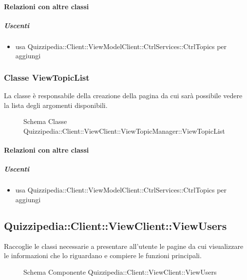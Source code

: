 \paragraph{Relazioni con altre classi}
\subparagraph{Uscenti}
\begin{itemize}
\item usa Quizzipedia::Client::ViewModelClient::CtrlServices::CtrlTopics per aggiungi
\end{itemize}
\subsubsection{Classe ViewTopicList}
La classe è responsabile della creazione della pagina da cui sarà possibile vedere la lista degli argomenti disponibili.
\begin{figure}[H]
\centering
\noindent{}
\caption[Schema Classe ViewTopicList]{Schema Classe Quizzipedia::Client::ViewClient::ViewTopicManager::ViewTopicList}
\end{figure}
\paragraph{Relazioni con altre classi}
\subparagraph{Uscenti}
\begin{itemize}
\item usa Quizzipedia::Client::ViewModelClient::CtrlServices::CtrlTopics per aggiungi
\end{itemize}
\subsection{Quizzipedia::Client::ViewClient::ViewUsers}
Raccoglie le classi necessarie a presentare all'utente le pagine da cui visualizzare le informazioni che lo riguardano e compiere le funzioni principali.
\begin{figure}[H]
\centering
\noindent{}
\caption[Schema Componente Quizzipedia::Client::ViewClient::ViewUsers]{Schema Componente Quizzipedia::Client::ViewClient::ViewUsers}
\end{figure}
